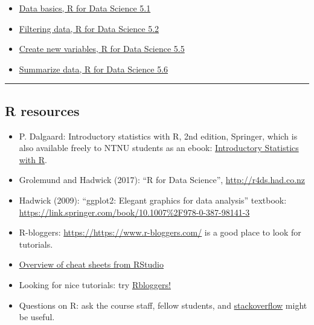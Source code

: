 \documentclass[]{article}
\providecommand{\tightlist}{%
  \setlength{\itemsep}{0pt}\setlength{\parskip}{0pt}}
\begin{document}
\begin{itemize}
\tightlist
\item
  \href{https://jjallaire.shinyapps.io/learnr-tutorial-01-data-basics/}{Data
  basics, R for Data Science 5.1}
\item
  \href{https://jjallaire.shinyapps.io/learnr-tutorial-03a-data-manip-filter/}{Filtering
  data, R for Data Science 5.2}
\item
  \href{https://jjallaire.shinyapps.io/learnr-tutorial-03b-data-manip-mutate/}{Create
  new variables, R for Data Science 5.5}
\item
  \href{https://jjallaire.shinyapps.io/learnr-tutorial-03c-data-manip-summarise/}{Summarize
  data, R for Data Science 5.6}
\end{itemize}

\begin{center}\rule{0.5\linewidth}{\linethickness}\end{center}

\hypertarget{r-resources}{%
\subsection{R resources}\label{r-resources}}

\begin{itemize}
\item
  P. Dalgaard: Introductory statistics with R, 2nd edition, Springer,
  which is also available freely to NTNU students as an ebook:
  \href{http://link.springer.com/book/10.1007\%2F978-0-387-79054-1}{Introductory
  Statistics with R}.
\item
  Grolemund and Hadwick (2017): ``R for Data Science'',
  \url{http://r4ds.had.co.nz}
\item
  Hadwick (2009): ``ggplot2: Elegant graphics for data analysis''
  textbook:
  \url{https://link.springer.com/book/10.1007\%2F978-0-387-98141-3}
\item
  R-bloggers: \url{https://https://www.r-bloggers.com/} is a good place
  to look for tutorials.
\item
  \href{https://www.rstudio.com/resources/cheatsheets/}{Overview of
  cheat sheets from RStudio}
\item
  Looking for nice tutorials: try
  \href{https://www.r-bloggers.com/}{Rbloggers!}
\item
  Questions on R: ask the course staff, fellow students, and
  \href{https://stackoverflow.com/}{stackoverflow} might be useful.
\end{itemize}
\end{document}
